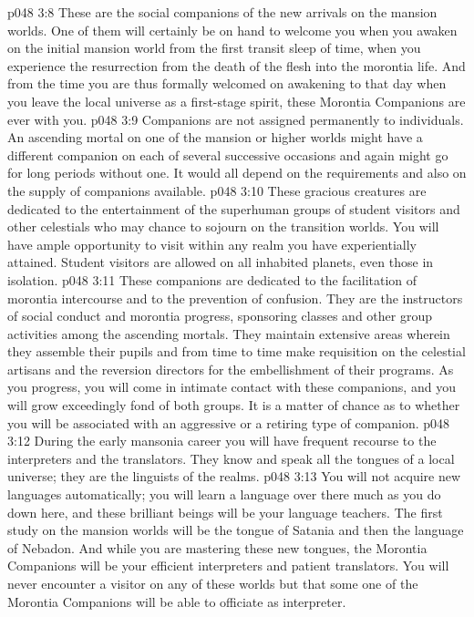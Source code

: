 \pc \vs p048 3:8 \bibnobreakspace {} These are the social companions of the new arrivals on the mansion worlds. One of them will certainly be on hand to welcome you when you awaken on the initial mansion world from the first transit sleep of time, when you experience the resurrection from the death of the flesh into the morontia life. And from the time you are thus formally welcomed on awakening to that day when you leave the local universe as a first\hyp{}stage spirit, these Morontia Companions are ever with you.
\vs p048 3:9 Companions are not assigned permanently to individuals. An ascending mortal on one of the mansion or higher worlds might have a different companion on each of several successive occasions and again might go for long periods without one. It would all depend on the requirements and also on the supply of companions available.
\pc \vs p048 3:10 \bibnobreakspace {} These gracious creatures are dedicated to the entertainment of the superhuman groups of student visitors and other celestials who may chance to sojourn on the transition worlds. You will have ample opportunity to visit within any realm you have experientially attained. Student visitors are allowed on all inhabited planets, even those in isolation.
\pc \vs p048 3:11 \bibnobreakspace {} These companions are dedicated to the facilitation of morontia intercourse and to the prevention of confusion. They are the instructors of social conduct and morontia progress, sponsoring classes and other group activities among the ascending mortals. They maintain extensive areas wherein they assemble their pupils and from time to time make requisition on the celestial artisans and the reversion directors for the embellishment of their programs. As you progress, you will come in intimate contact with these companions, and you will grow exceedingly fond of both groups. It is a matter of chance as to whether you will be associated with an aggressive or a retiring type of companion.
\pc \vs p048 3:12 \bibnobreakspace {} During the early mansonia career you will have frequent recourse to the interpreters and the translators. They know and speak all the tongues of a local universe; they are the linguists of the realms.
\vs p048 3:13 You will not acquire new languages automatically; you will learn a language over there much as you do down here, and these brilliant beings will be your language teachers. The first study on the mansion worlds will be the tongue of Satania and then the language of Nebadon. And while you are mastering these new tongues, the Morontia Companions will be your efficient interpreters and patient translators. You will never encounter a visitor on any of these worlds but that some one of the Morontia Companions will be able to officiate as interpreter.

